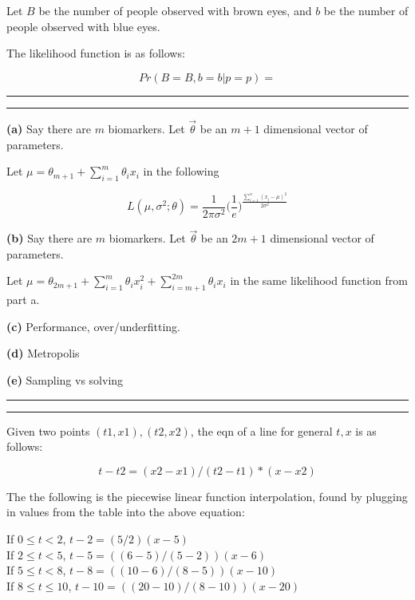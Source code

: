 \documentclass[11pt,letterpaper]{article}
\newcommand{\question}[1] {\vspace{.25in} \hrule\vspace{0.5em}
\noindent{\bf #1} \vspace{0.5em}
\hrule \vspace{.10in}}
\renewcommand{\part}[1] {\vspace{.10in} {\bf (#1)}}
\begin{document}
Let $B$ be the number of people observed with brown eyes,
and $b$ be the number of people observed with blue eyes.

The likelihood function is as follows:

$$Pr(B=B, b=b | p=p) = $$

\question{2}

\part{a}
Say there are $m$ biomarkers. Let $\vec{\theta}$ be an $m+1$ dimensional vector of parameters.

Let $\mu =  \theta_{m+1} + \sum_{i=1}^{m} \theta_i x_i $ in the following

$$L(\mu, \sigma^2; \theta) = \frac{1}{2\pi\sigma^2} \bigg(\frac{1}{e}\bigg)^\frac{\sum_{i=1}^{n} (x_i-\mu)^2}{2\sigma^2}$$



\part{b}
Say there are $m$ biomarkers. Let $\vec{\theta}$ be an $2m+1$ dimensional vector of parameters.

Let $\mu =  \theta_{2m+1} + \sum_{i=1}^{m} \theta_i x_i^2 + \sum_{i=m+1}^{2m} \theta_i x_i $ in the same likelihood function from part a.

\part{c}
Performance, over/underfitting.

\part{d}
Metropolis

\part{e}
Sampling vs solving

\question{3}
Given two points $(t1,x1),(t2,x2)$, the eqn of a line for general $t,x$ is as follows:

$$t - t2 = (x2 - x1)/(t2 - t1) * (x - x2)$$

The the following is the piecewise linear function interpolation, found by plugging in values from the table into the above equation:

If $0 \leq t < 2$, $t - 2 = (5/2)(x - 5)$\\
If $2 \leq t < 5$, $t - 5 = ((6-5)/(5-2))(x-6)$\\
If $5 \leq t < 8$, $t - 8 = ((10-6)/(8-5))(x-10)$\\
If $8 \leq t \leq 10$, $t - 10 = ((20-10)/(8-10))(x-20)$
\end{document}
